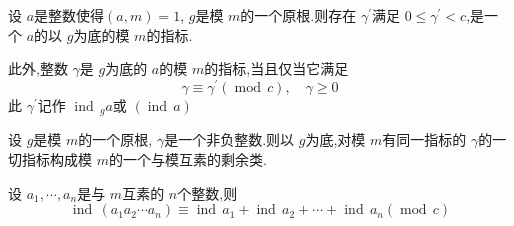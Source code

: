 \documentclass[lang=cn,12pt,color=green,fontset=none]{elegantbook}
\begin{document}
\begin{theorem}
    设 \(  a  \)是整数使得\(  \left( a,m \right)= 1   \), \(  g  \)是模 \(  m  \)的一个原根.则存在 \(   \gamma ^{\prime}   \)满足 \(  0\le  \gamma ^{\prime} <c  \),是一个 \(  a  \)的以 \(  g  \)为底的模 \(  m  \)的指标.
    
    此外,整数 \(   \gamma   \)是  \(  g  \)为底的 \(  a  \)的模 \(  m  \)的指标,当且仅当它满足 \[
     \gamma \equiv  \gamma ^{\prime} \left( \operatorname{mod}\,c \right),\quad  \gamma \ge 0 
    \]此 \(   \gamma ^{\prime}   \)记作 \(  \operatorname{ind}\,_{g}a  \)或 \(  \left( \operatorname{ind}\,a \right)   \)   
\end{theorem}

\begin{theorem}
    设 \(  g  \)是模 \(  m  \)的一个原根, \(   \gamma   \)是一个非负整数.则以 \(  g  \)为底,对模 \(  m  \)有同一指标的 \(   \gamma   \)的一切指标构成模 \(  m  \)的一个与模互素的剩余类.      
\end{theorem}


\begin{theorem}
    设 \(   a_1,\cdots,a_n   \)是与 \(  m  \)互素的 \(  n  \)个整数,则 \[
    \operatorname{ind}\,\left( a_1a_2\cdots a_{n} \right) \equiv  \operatorname{ind}\,a_1+ \operatorname{ind}\,a_2+ \cdots + \operatorname{ind}\,a_{n}\left( \operatorname{mod}\,c \right)  
    \]   
\end{theorem}
\end{document}
